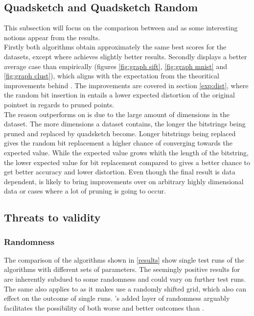 \subsection{Quadsketch and Quadsketch Random}
This subsection will focus on the comparison between \qs{} and \qsr{} as some interesting notions appear from the results. 
\\
Firstly both algorithms obtain approximately the same best scores for the datasets, except \mnist{} where \qsr{} achieves slightly better results. 
Secondly \qsr{} displays a better average case than \qs{} empirically (figures \ref{fig:graph sift}, \ref{fig:graph mnist} and \ref{fig:graph clust}), which aligns with the expectation from the theoritical improvements behind \qsr{}. The improvements are covered in section \ref{exp:dist}, where the random bit insertion in \qsr{} entails a lower expected distortion of the original pointset in regards to pruned points.
\\
The reason \qsr{} outperforms \qs{} on \mnist{} is due to the large amount of dimensions in the \mnist{} dataset. The more dimensions a dataset contains, the longer the bitstrings being pruned and replaced by quadsketch become. Longer bitstrings being replaced gives the random bit replacement a higher chance of converging towards the expected value. While the expected value grows whith the length of the bitstring, the lower expected value for \qsr{} bit replacement compared to \qs{} gives \qsr{} a better chance to get better accuracy and lower distortion. Even though the final result is data dependent, \qsr{} is likely to bring improvements over \qs{} on arbitrary highly dimensional data or cases where a lot of pruning is going to occur.

\subsection{Threats to validity}

\subsubsection{Randomness}
\label{disc/threats/randomness}
The comparison of the algorithms shown in \ref{results} show single test runs of the algorithms with different sets of parameters. The seemingly positive results for \qsr{} are inherently subdued to some randomness and could vary on further test runs. The same also applies to \qs{} as it makes use a randomly shifted grid, which also can effect on the outcome of single runs. \qsr{}'s added layer of randomness arguably facilitates the possibility of both worse and better outcomes than \qs{}.

